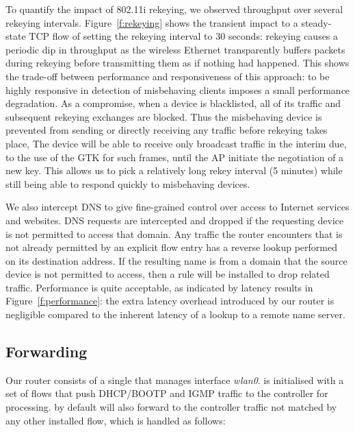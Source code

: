 To quantify the impact of 802.11i rekeying, we observed throughput over several
rekeying intervals.  Figure~\ref{f:rekeying} shows the transient impact to a
steady-state TCP flow of setting the
rekeying interval to 30 seconds: rekeying causes a periodic dip in throughput as the
wireless Ethernet transparently buffers packets during rekeying before
transmitting them as if nothing had happened.  This shows the trade-off between
performance and responsiveness of this approach: to be highly responsive in
detection of misbehaving clients imposes a small performance degradation.  As a
compromise, when a device is blacklisted, all of its traffic and subsequent
rekeying exchanges are blocked.  Thus the misbehaving device is prevented from
sending or directly receiving any traffic before rekeying takes place, The
device will be able to receive only broadcast traffic in the interim due, to the
use of the GTK for such frames, until the AP initiate the negotiation of a new
key.  This allows us to pick a relatively long rekey interval (5 minutes) while
still being able to respond quickly to misbehaving devices.

We also intercept DNS to give fine-grained control over access to Internet
services and websites.  DNS requests are intercepted and dropped if the
requesting device is not permitted to access that domain.  Any traffic the
router encounters that is not already permitted by an explicit \of flow
entry has a reverse lookup performed on its destination address.  If the
resulting name is from a domain that the source device is not permitted to
access, then a rule will be installed to drop related traffic.  Performance is
quite acceptable, as indicated by latency results in Figure~\ref{f:performance}:
the extra latency overhead introduced by our router is negligible compared to
the inherent latency of a lookup to a remote name server.  

\subsection{Forwarding} \label{s:forwarding}
 
Our router consists of a single \ovs that manages interface
\emph{wlan0}.  \ovs is initialised with a set of flows that push
DHCP/BOOTP and IGMP traffic to the controller for processing.
\ovs by default will also forward to the controller traffic not matched
by any other installed flow, which is handled as follows:

